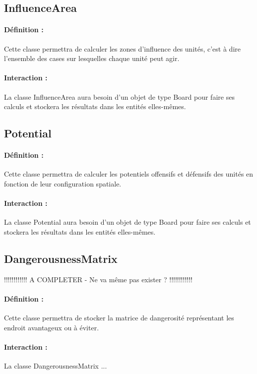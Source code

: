 		\subsection*{InfluenceArea}

			\paragraph{Définition :}
			Cette classe permettra de calculer les zones d'influence des unités, c'est à dire l'ensemble des cases sur lesquelles 
			chaque unité peut agir.
			\paragraph{Interaction :}
			La classe InfluenceArea aura besoin d'un objet de type Board pour faire ses calculs et stockera les résultats dans 
			les entités elles-mêmes.

		\subsection*{Potential}

			\paragraph{Définition :}
			Cette classe permettra de calculer les potentiels offensifs et défensifs des unités en fonction de leur configuration spatiale.
			\paragraph{Interaction :}
			La classe Potential aura besoin d'un objet de type Board pour faire ses calculs et stockera les résultats dans les 
			entités elles-mêmes.

		\subsection*{DangerousnessMatrix}

			!!!!!!!!!!!! A COMPLETER - Ne va même pas exister ? !!!!!!!!!!!!
			\paragraph{Définition :}
			Cette classe permettra de stocker la matrice de dangerosité représentant les endroit avantageux ou à éviter.
			\paragraph{Interaction :}
			La classe DangerousnessMatrix ...

